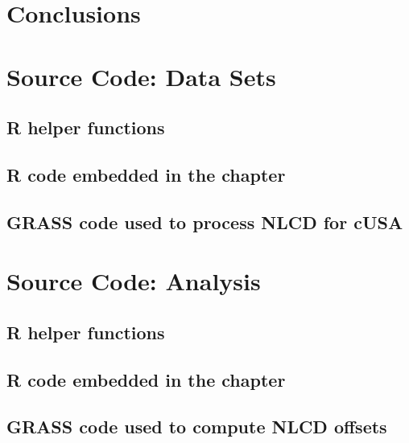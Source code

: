 \documentclass[draftthesis]{neiuthesis}
\begin{document}
\mainmatter

\todototoc
\listoftodos





\chapter{Conclusions}
\label{cha:conclusions}



\backmatter



\appendix

\chapter{Source Code: Data Sets}

\section*{R helper functions}


\section*{R code embedded in the chapter}


\section*{GRASS code used to process NLCD for cUSA}


\chapter{Source Code: Analysis}

\section*{R helper functions}


\section*{R code embedded in the chapter}


\section*{GRASS code used to compute NLCD offsets}

\end{document}
